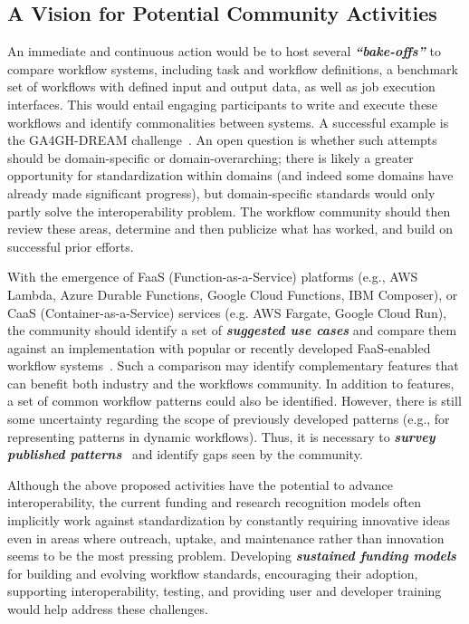 \subsection{A Vision for Potential Community Activities}

An immediate and continuous action would be to host several \textbf{\emph{``bake-offs''}} to compare workflow systems, including task and workflow definitions, a benchmark set of workflows with defined input and output data, as well as job execution interfaces. This would entail engaging participants to write and execute these workflows and identify commonalities between systems. A successful example is the GA4GH-DREAM challenge~\cite{ga4gh}. An open question is whether such attempts should be domain-specific or domain-overarching;  there is likely a greater opportunity for standardization within domains (and indeed some domains have already made significant progress), but domain-specific standards would only partly solve the interoperability problem. The workflow community should then review these areas, determine and then publicize what has worked, and build on successful prior efforts.

With the emergence of FaaS (Function-as-a-Service) platforms (e.g., AWS Lambda, Azure Durable Functions, Google Cloud Functions, IBM Composer), or CaaS (Container-as-a-Service) services (e.g. AWS Fargate, Google Cloud Run), the community should identify a set of \textbf{\emph{suggested use cases}} and compare them against an implementation with popular or recently developed FaaS-enabled workflow systems~\cite{chard2020funcx, smirnov2020apollo, malawski2020serverless}. Such a comparison may identify complementary features that can benefit both industry and the workflows community. In addition to features, a set of common workflow patterns could also be identified. However, there is still some uncertainty regarding the scope of previously developed patterns (e.g., for representing patterns in dynamic workflows). Thus, it is necessary to \textbf{\emph{survey published patterns}}~\cite{workflowpatterns,garijo2014common} and identify gaps seen by the community.

Although the above proposed activities have the potential to advance interoperability, the current funding and research recognition models often implicitly work against standardization by constantly requiring innovative ideas even in areas where outreach, uptake, and maintenance rather than innovation seems to be the most pressing problem. Developing \textbf{\emph{sustained funding models}} for building and evolving workflow standards, encouraging their adoption, supporting interoperability, testing, and providing user and developer training would help address these challenges. 
